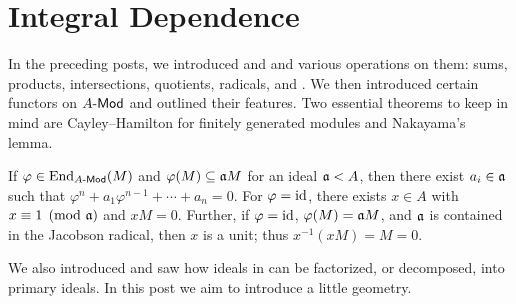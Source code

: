 \documentclass[11pt,a4paper]{article}
\begin{document}
\section*{Integral Dependence}
In the preceding posts, we introduced  and  and various operations on them: sums, products, intersections, quotients, radicals, and . We then introduced certain functors on $\AMod$ and outlined their features. Two essential theorems to keep in mind are Cayley--Hamilton for finitely generated modules and Nakayama's lemma.

If $\varphi\in\End_{\AMod}(M)$ and $\varphi(M)\subseteq\aa M$ for an ideal $\aa<A$, then there exist $a_i\in\aa$ such that $\varphi^n+a_1\varphi^{n-1}+\cdots+a_n=0$. For $\varphi=\id$, there exists $x\in A$ with $x\equiv1\pmod\aa$ and $xM=0$. Further, if $\varphi=\id$, $\varphi(M)=\aa M$, and $\aa$ is contained in the Jacobson radical, then $x$ is a unit; thus $x^{-1}(xM)=M=0$.

We also introduced  and saw how ideals in  can be factorized, or decomposed, into primary ideals. In this post we aim to introduce a little geometry.
\end{document}
